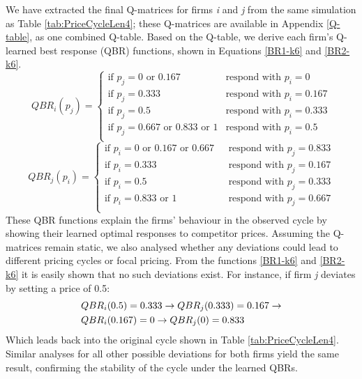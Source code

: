 \documentclass{article}
\begin{document}
\newline
We have extracted the final Q-matrices for firms \textit{i} and \textit{j} from the same simulation as Table \ref{tab:PriceCycleLen4}; these Q-matrices are available in Appendix \ref{Q-table}, as one combined Q-table. Based on the Q-table, we derive each firm’s Q-learned best response (QBR) functions, shown in Equations \ref{BR1-k6} and \ref{BR2-k6}.
\begin{equation}
    \label{BR1-k6}
    QBR_i(p_j)=\begin{cases}
        \text{if $p_j= 0\text{ or }0.167$}& \text{respond with $p_i=0$}\\
        \text{if $p_j= 0.333$}& \text{respond with $p_i=0.167$}\\
        \text{if $p_j= 0.5$}& \text{respond with $p_i=0.333$}\\
        \text{if $p_j= 0.667\text{ or }0.833 \text{ or } 1$}& \text{respond with $p_i=0.5$}\\
    \end{cases}
\end{equation}
\begin{equation}
    \label{BR2-k6}
    QBR_j(p_i)=\begin{cases}
        \text{if $p_i= 0 \text{ or } 0.167\text{ or } 0.667$  }& \text{respond with $p_j=0.833$}\\
        \text{if $p_i= 0.333$}& \text{respond with $p_j=0.167$}\\
        \text{if $p_i= 0.5$}& \text{respond with $p_j=0.333$}\\
        \text{if $p_i= 0.833\text{ or } 1$ }& \text{respond with $p_j=0.667$}\\
    \end{cases}
\end{equation}
These QBR functions explain the firms’ behaviour in the observed cycle by showing their learned optimal responses to competitor prices. Assuming the Q-matrices remain static, we also analysed whether any deviations could lead to different pricing cycles or focal pricing. From the functions \ref{BR1-k6} and \ref{BR2-k6} it is easily shown that no such deviations exist. For instance, if firm \textit{j} deviates by setting a price of 0.5:
\begin{align}
    &QBR_i(0.5) = 0.333 \rightarrow QBR_j(0.333)=0.167 \rightarrow \\ &QBR_i(0.167) = 0 \rightarrow QBR_j(0) = 0.833\notag
\end{align}
Which leads back into the original cycle shown in Table \ref{tab:PriceCycleLen4}. Similar analyses for all other possible deviations for both firms yield the same result, confirming the stability of the cycle under the learned QBRs.
\end{document}
